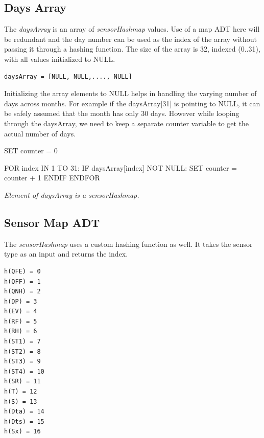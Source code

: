 \documentclass[12pt]{article}
\begin{document}
\subsection{Days Array}
The {\em daysArray} is an array of {\em sensorHashmap} values. Use of a map ADT here will be redundant and the day number can be used as the index of the array without passing it through a hashing function. The size of the array is 32, indexed (0..31), with all values initialized to NULL.
\begin{lstlisting}
daysArray = [NULL, NULL,...., NULL]
\end{lstlisting}
Initializing the array elements to NULL helps in handling the varying number of days across months. For example if the daysArray[31] is pointing to NULL, it can be safely assumed that the month has only 30 days. However while looping through the daysArray, we need to keep a separate counter variable to get the actual number of days.
\begin{algorithm}[caption={Count number of days in a given daysArray.}, label={subalgo2}]
SET counter = 0

FOR index IN 1 TO 31:
	IF daysArray[index] NOT NULL:
		SET counter = counter + 1
	ENDIF
ENDFOR	
\end{algorithm}
{\em Element of daysArray is a sensorHashmap.}
\subsection{Sensor Map ADT}
The {\em sensorHashmap} uses a custom hashing function as well. It takes the sensor type as an input and returns the index.
\begin{lstlisting}
h(QFE) = 0
h(QFF) = 1
h(QNH) = 2
h(DP) = 3
h(EV) = 4
h(RF) = 5
h(RH) = 6
h(ST1) = 7
h(ST2) = 8
h(ST3) = 9
h(ST4) = 10
h(SR) = 11
h(T) = 12
h(S) = 13
h(Dta) = 14
h(Dts) = 15
h(Sx) = 16
\end{lstlisting}
\end{document}
